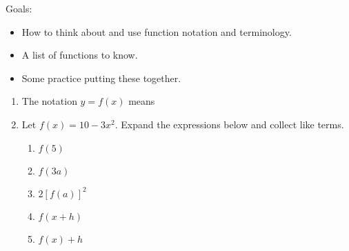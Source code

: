 \documentclass[11pt,fleqn]{article}
\begin{document}
\renewcommand{\headrulewidth}{0pt}
\newcommand{\blank}[1]{\rule{#1}{0.75pt}}
\renewcommand{\d}{\displaystyle}
\vspace*{-0.7in}
\begin{center}
  \large {}
\end{center}
Goals:
\begin{itemize}
\item How to think about and use function notation and terminology.
\item A list of functions to know.
\item Some practice putting these together.
\end{itemize}
\begin{enumerate}
\item The notation $y=f(x)$ means\\
\vspace{1in}
\item  Let $f(x) = 10-3x^2.$ Expand the expressions below and collect like terms. 
\begin{multicols}{2}
 \begin{enumerate}
      \item $\d f(5)$\\
      
	\vspace{1in}
	
      \item $\d f(3a)$\\
      
	\vspace{1in}

      \item $\d 2\left[f(a)\right]^2$\\
      
	\vspace{1in}   
	\columnbreak   
	
	\item $\d f(x+h) $\\
      
	\vspace{1in}      
	
	\item $\d f(x) + h$\\
      

\end{enumerate}
\end{multicols}
\end{enumerate}
\end{document}
